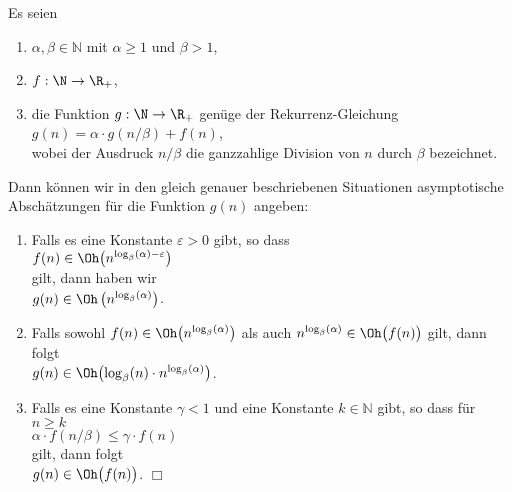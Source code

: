 \begin{Theorem} 
  Es seien 
  \begin{enumerate}
  \item $\alpha,\beta \in \mathbb{N}$ mit $\alpha \geq 1$ und $\beta > 1$,
  \item $f:\N \rightarrow \R_+$,
  \item die Funktion $g:\N \rightarrow \R_+$ gen\"uge der Rekurrenz-Gleichung 
        \\[0.2cm]
        \hspace*{1.3cm}
        $g(n) = \alpha \cdot g\left(n/\beta\right) + f(n)$,
        \\[0.2cm]
        wobei der Ausdruck $n/\beta$ die ganzzahlige Division von $n$ durch $\beta$ bezeichnet.
  \end{enumerate}
  Dann k\"onnen wir in den gleich genauer beschriebenen Situationen asymptotische
  Absch\"atzungen f\"ur die Funktion $g(n)$ angeben:
  \begin{enumerate}
  \item Falls es eine Konstante $\varepsilon > 0$ gibt, so dass 
        \\[0.2cm]
        \hspace*{1.3cm}
        $f(n) \in \Oh\bigl(n^{\log_\beta(\alpha) - \varepsilon}\bigr)$
        \\[0.2cm]
        gilt, dann haben wir 
        \\[0.2cm]
        \hspace*{1.3cm}
        $g(n) \in \Oh\left(n^{\log_\beta(\alpha)}\right)$.
  \item Falls sowohl $f(n) \in \Oh\bigl(n^{\log_\beta(\alpha)}\bigr)$ als auch $n^{\log_\beta(\alpha)} \in \Oh\bigl(f(n)\bigr)$
        gilt, dann folgt
        \\[0.2cm]
        \hspace*{1.3cm}
        $g(n) \in \Oh\bigl(\log_\beta(n) \cdot n^{\log_\beta(\alpha)}\bigr)$. 
  \item Falls es eine Konstante $\gamma < 1$ und eine Konstante $k \in \mathbb{N}$ gibt, so dass
        f\"ur $n \geq k$
        \\[0.2cm]
        \hspace*{1.3cm}
        $\alpha \cdot f\left(n/\beta\right) \leq \gamma \cdot f(n)$        
        \\[0.2cm]
        gilt, dann folgt 
        \\[0.2cm]
        \hspace*{1.3cm}
        $g(n) \in \Oh\bigl(f(n)\bigr)$. \hspace*{\fill} $\Box$
  \end{enumerate}
\end{Theorem}
